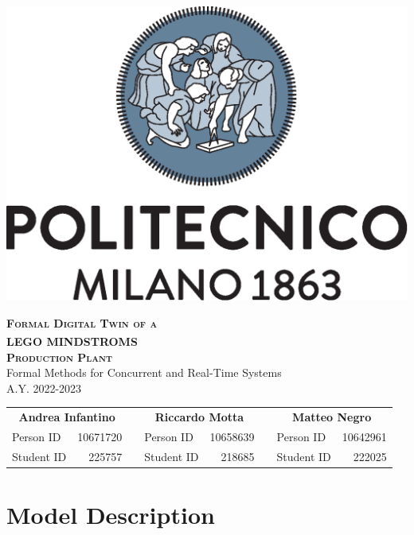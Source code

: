 \documentclass[a4paper]{article}
\newcommand{\nbvspace}[1][3]{\vspace*{\stretch{#1}}}
\begin{document}
    \begin{titlepage}

        \begin{center}

            \nbvspace[1]

            \includegraphics[width=0.3\columnwidth]{./images/polimi}

            \nbvspace[2]

            {\huge \textbf{\textsc{Formal Digital Twin of a \\ LEGO\textsuperscript{\textregistered} MINDSTROMS\texttrademark \\\medskip Production Plant}}} \\
            [3em]
            {\Large Formal Methods for Concurrent and Real-Time Systems} \\
            [1.5em]
            {\Large A.Y. 2022-2023}

            \nbvspace[8]

            \begin{tabular}{lrp{}lrp{}lr}
                \multicolumn{2}{c}{\large \textbf{Andrea Infantino}} & & \multicolumn{2}{c}{\large \textbf{Riccardo Motta}} & & \multicolumn{2}{c}{\large \textbf{Matteo Negro}} \\
                Person ID & 10671720 & & Person ID & 10658639 & & Person ID & 10642961 \\
                Student ID & 225757 & & Student ID & 218685 & & Student ID & 222025
            \end{tabular}

            \nbvspace[1]

        \end{center}

    \end{titlepage}

    \tableofcontents{}

    \pagebreak

    \section{Model Description}
\end{document}
